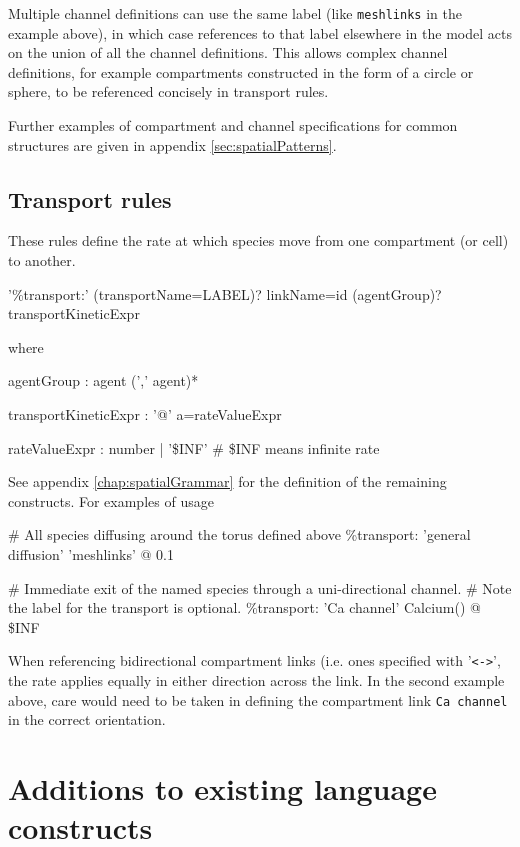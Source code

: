Multiple channel definitions can use the same label (like \verb|meshlinks| in the example above), in which case references to that label elsewhere in the model acts on the union of all the channel definitions. This allows complex channel definitions, for example compartments constructed in the form of a circle or sphere, to be referenced concisely in transport rules.

Further examples of compartment and channel specifications for common structures are given in appendix
 \ref{sec:spatialPatterns}.

\subsection{Transport rules}

These rules define the rate at which species move from one compartment (or cell) to another.
\begin{bnfsource}
'\%transport:' (transportName=LABEL)? linkName=id (agentGroup)? transportKineticExpr
\end{bnfsource}
  where
\begin{bnfsource}
agentGroup :
  agent (',' agent)*

transportKineticExpr :
  '@' a=rateValueExpr

rateValueExpr :
  number | '\$INF'   # \$INF means infinite rate
\end{bnfsource}

See appendix \ref{chap:spatialGrammar} for the definition of the remaining constructs. For examples of usage

\begin{kappasource}
# All species diffusing around the torus defined above
\%transport: 'general diffusion' 'meshlinks' @ 0.1

# Immediate exit of the named species through a uni-directional channel.
# Note the label for the transport is optional.
\%transport: 'Ca channel' Calcium() @ \$INF
\end{kappasource}

When referencing bidirectional compartment links (i.e. ones specified with '\verb|<->|', the rate applies equally in either direction across the link. In the second example above, care would need to be taken in defining the compartment link \verb|Ca channel| in the correct orientation.

\section{Additions to existing language constructs}


